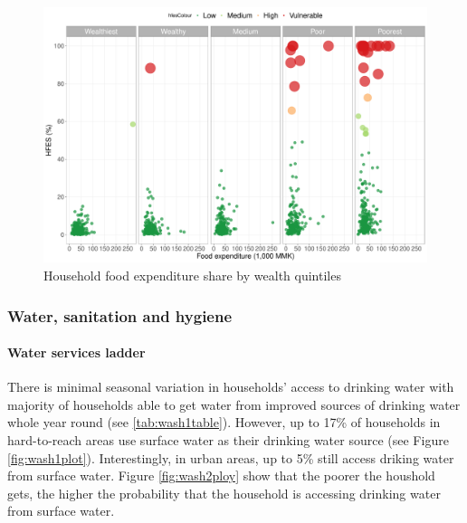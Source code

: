 \documentclass[12pt,a4paper]{article}
\let\oldparagraph\paragraph
\renewcommand{\paragraph}[1]{\oldparagraph{#1}\mbox{}}
\begin{document}
\begin{figure}[H]

{\centering \includegraphics{kayahReport_files/figure-latex/hfesScatterPlot2-1} 

}

\caption{Household food expenditure share by wealth quintiles}\label{fig:hfesScatterPlot2}
\end{figure}

\hypertarget{wash-results}{%
\subsubsection{Water, sanitation and hygiene}\label{wash-results}}

\hypertarget{water-results}{%
\paragraph{Water services ladder}\label{water-results}}

There is minimal seasonal variation in households' access to drinking water with majority of households able to get water from improved sources of drinking water whole year round (see \ref{tab:wash1table}). However, up to 17\% of households in hard-to-reach areas use surface water as their drinking water source (see Figure \ref{fig:wash1plot}). Interestingly, in urban areas, up to 5\% still access driking water from surface water. Figure \ref{fig:wash2ploy} show that the poorer the houshold gets, the higher the probability that the household is accessing drinking water from surface water.
\end{document}
